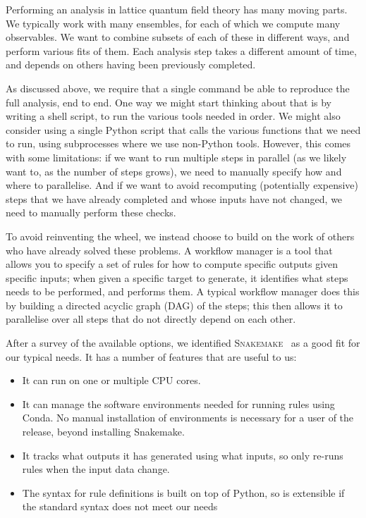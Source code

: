 \documentclass{article}
\newcommand\program[1]{\textsc{#1}\xspace}
\begin{document}
Performing an analysis in lattice quantum field theory has many moving parts.
We typically work with many ensembles,
for each of which we compute many observables.
We want to combine subsets of each of these in different ways,
and perform various fits of them.
Each analysis step takes a different amount of time,
and depends on others having been previously completed.

As discussed above,
we require that a single command be able to reproduce the full analysis,
end to end.
One way we might start thinking about that is by writing a shell script,
to run the various tools needed in order.
We might also consider using a single Python script
that calls the various functions that we need to run,
using subprocesses where we use non-Python tools.
However,
this comes with some limitations:
if we want to run multiple steps in parallel
(as we likely want to,
as the number of steps grows),
we need to manually specify how and where to parallelise.
And if we want to avoid recomputing
(potentially expensive)
steps that we have already completed
and whose inputs have not changed,
we need to manually perform these checks.

To avoid reinventing the wheel,
we instead choose to build on the work of others who have already solved these problems.
A workflow manager is a tool that allows you to specify
a set of rules for how to compute specific outputs given specific inputs;
when given a specific target to generate,
it identifies what steps needs to be performed,
and performs them.
A typical workflow manager does this
by building a directed acyclic graph
(DAG)
of the steps;
this then allows it to parallelise over all steps that do not directly depend on each other.

After a survey of the available options,
we identified \program{Snakemake}~\cite{molder2021sustainable} as a good fit for our typical needs.
It has a number of features that are useful to us:

\begin{itemize}
  \item
        It can run on one or multiple CPU cores.
  \item
        It can manage the software environments needed for running rules using Conda.
        No manual installation of environments is necessary for a user of the release,
        beyond installing Snakemake.
  \item
        It tracks what outputs it has generated using what inputs,
        so only re-runs rules when the input data change.
  \item
        The syntax for rule definitions is built on top of Python,
        so is extensible if the standard syntax does not meet our needs
\end{itemize}
\end{document}

